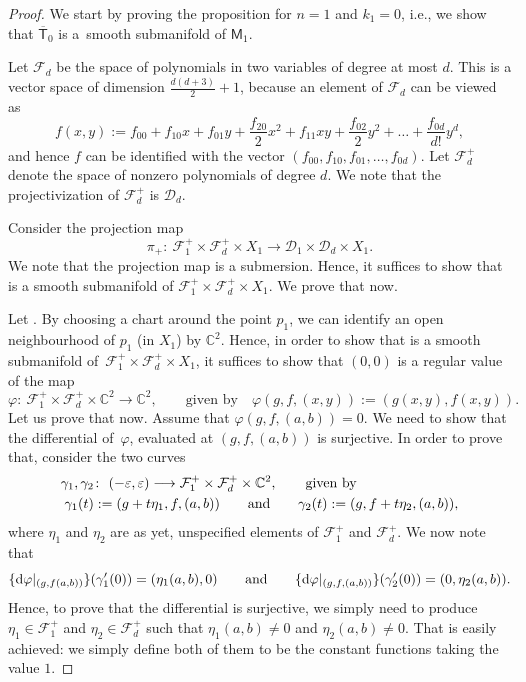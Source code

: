 \documentclass[pdftex]{sigma}
\numberwithin{equation}{section}
\begin{document}
\begin{proof}
We start by proving the proposition for $n = 1$
and $k_1 = 0$, i.e., we show that $\overline{\mathsf{T}}_0$ is a~smooth
submanifold of $\mathsf{M}_1$.

Let $\mathcal{F}_d$ be the space of
polynomials in two variables of degree at most $d$.
This is a vector space of dimension $\frac{d(d+3)}{2} + 1$, because
an element of $\mathcal{F}_d$ can be viewed as
\[
 f(x, y) := f_{00} + f_{10}x + f_{01} y + \frac{f_{20}}{2} x^2 + f_{11} xy + \frac{f_{02}}{2} y^2 +
\dots + \frac{f_{0d}}{d!} y^d,
\]
and hence $f$ can be identified with the vector
$(f_{00}, f_{10}, f_{01},\dots, f_{0d})$.
Let $\mathcal{F}_d^{+}$ denote the space of nonzero polynomials of degree $d$.
We note that the projectivization of $\mathcal{F}_d^{+}$ is $\mathcal{D}_d$.

Consider the projection map
\[ \pi_{+}\colon\ \mathcal{F}_1^{+} \times \mathcal{F}_d^{+} \times X_1 \longrightarrow
\mathcal{D}_1 \times \mathcal{D}_d \times X_1.  \]
We note that the projection map is a submersion. Hence, it suffices to show that
 is a smooth submanifold of
$\mathcal{F}_1^{+} \times \mathcal{F}_d^{+} \times X_1$. We prove that now.

Let .
By choosing a chart around the point $p_1$, we can identify an open neighbourhood of
$p_1$ (in $X_1$) by $\mathbb{C}^2$. Hence, in order to show that
 is a smooth
submanifold of~${\mathcal{F}_1^{+} \times \mathcal{F}_d^{+} \times X_1}$, it suffices to show that
$(0,0)$ is a regular value of the map
\[\varphi \colon\ \mathcal{F}_1^{+} \times \mathcal{F}_d^{+} \times \mathbb{C}^2 \longrightarrow
\mathbb{C}^2,
\qquad \text{given by}
\quad \varphi(g, f, (x, y)) := (g(x, y), f(x, y)).\]
Let us prove that now. Assume that $\varphi(g,f,(a,b))=0$.
We need to show that the differential of~$\varphi$,
evaluated at $(g, f, (a, b))$ is surjective.
In order to prove that, consider the two curves
\begin{align*}
\gamma_1, \gamma_2&\colon\ (-\varepsilon, \varepsilon)\longrightarrow
\mathcal{F}_1^{+} \times \mathcal{F}_d^{+} \times \mathbb{C}^2,
\qquad \textnormal{given by} \\
\gamma_1(t)&:= (g + t\eta_1, f, (a, b)) \qquad \textnormal{and}
\qquad \gamma_2(t):= (g, f+t\eta_2, (a, b)),
\end{align*}
where
$\eta_1$ and $\eta_2$ are as yet, unspecified elements of
$\mathcal{F}_1^{+}$ and $\mathcal{F}_d^{+}$.
We now note that
\[\{{\rm d}\varphi|_{(g,f(a,b))}\}(\gamma_1^{\prime}(0)) = (\eta_1(a,b), 0)
\qquad \textnormal{and} \qquad \{{\rm d}\varphi|_{(g,f,(a,b))}\}(\gamma_2^{\prime}(0)) = (0, \eta_2(a,b)).\]
Hence, to prove that the differential is surjective, we simply need to produce
$\eta_1 \in \mathcal{F}_1^{+}$ and $\eta_2 \in \mathcal{F}_d^{+}$
such that $\eta_1(a,b) \neq 0$ and $\eta_2(a,b) \neq 0$.
That is easily achieved: we simply define both of them to be the constant functions
taking the value $1$.


\end{proof}
\end{document}

